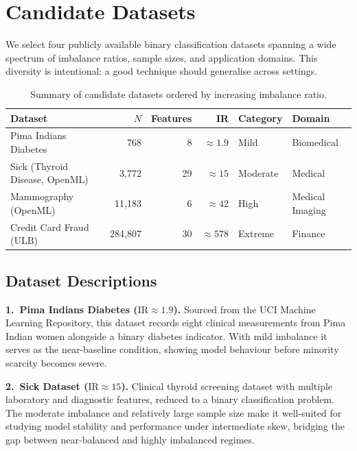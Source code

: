\documentclass[11pt,a4paper]{article}
\newcommand{\IR}{\mathrm{IR}}
\begin{document}
\section{Candidate Datasets}

We select four publicly available binary classification datasets spanning a wide spectrum of
imbalance ratios, sample sizes, and application domains. This diversity is intentional: a good
technique should generalise across settings.

\begin{table}[ht]
\centering
\caption{Summary of candidate datasets ordered by increasing imbalance ratio.}
\begin{tabular}{lrrrll}
\toprule
\textbf{Dataset} & \textbf{$N$} & \textbf{Features} & \textbf{IR} & \textbf{Category} & \textbf{Domain} \\
\midrule
Pima Indians Diabetes    &    768 &  8 & $\approx 1.9$ & Mild     & Biomedical      \\
Sick (Thyroid Disease{,} OpenML)    &  3{,}772 & 29 & $\approx 15$  & Moderate & Medical         \\
Mammography (OpenML)     & 11{,}183 &  6 & $\approx 42$  & High     & Medical Imaging \\
Credit Card Fraud (ULB)  & 284{,}807 & 30 & $\approx 578$ & Extreme  & Finance         \\
\bottomrule
\end{tabular}
\end{table}

\subsection{Dataset Descriptions}

\textbf{1.~Pima Indians Diabetes ($\IR \approx 1.9$).} Sourced from the UCI Machine
Learning Repository, this dataset records eight clinical measurements from Pima Indian women
alongside a binary diabetes indicator. With mild imbalance it serves as the near-baseline
condition, showing model behaviour before minority scarcity becomes severe.

\textbf{2.~Sick Dataset ($\IR \approx 15$).}  Clinical thyroid screening dataset with multiple laboratory and diagnostic features, reduced to a binary classification problem. The moderate imbalance and relatively large sample size make it well-suited for studying model stability and performance under intermediate skew, bridging the gap between near-balanced and highly imbalanced regimes.
\end{document}
